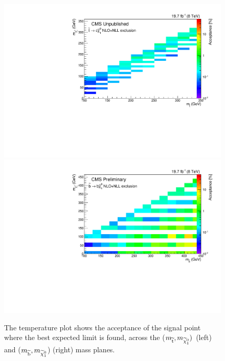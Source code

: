 \begin{figure}[!Hhtb]
  \begin{center}
  \includegraphics[scale=0.39]{Figures/sus13009/limitplots/plots/stop/optimal_stop_acceptance.pdf}
  \includegraphics[scale=0.39]{Figures/sus13009/limitplots/plots/sbottom/optimal_sbottom_acceptance.pdf}
  \caption{The temperature plot shows the acceptance of the signal point where the best expected limit is found, across the ($m_{\widetilde{{\rm t}}}, m_{\widetilde{\chi}^{0}_{1}})$ (left) and ($m_{\widetilde{{\rm b}}},m_{\widetilde{\chi}^{0}_{1}}$) (right) mass planes.}
  \label{fig:optimalacc}
  \end{center}
\end{figure}

